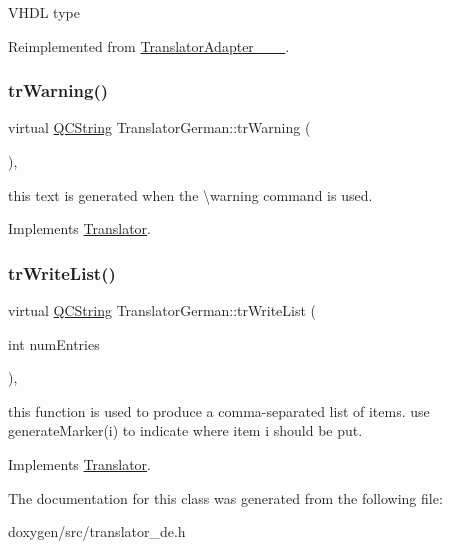 V\+H\+DL type 

Reimplemented from \mbox{\hyperlink{class_translator_adapter__1__8__15}{Translator\+Adapter\+\_\+\_\+\_}}.

\mbox{\label{class_translator_german_aee79ab416d3067077976eda0ec2fe9e6}} 
\subsubsection{\texorpdfstring{trWarning()}{trWarning()}}
{\footnotesize\ttfamily virtual \mbox{\hyperlink{class_q_c_string}{Q\+C\+String}} Translator\+German\+::tr\+Warning (\begin{DoxyParamCaption}{ }\end{DoxyParamCaption})\hspace{0.3cm}{\ttfamily [inline]}, {\ttfamily [virtual]}}

this text is generated when the \textbackslash{}warning command is used. 

Implements \mbox{\hyperlink{class_translator}{Translator}}.

\mbox{\label{class_translator_german_ad5fec4eb2e9d641fc19a4cd6e212a5d7}} 
\subsubsection{\texorpdfstring{trWriteList()}{trWriteList()}}
{\footnotesize\ttfamily virtual \mbox{\hyperlink{class_q_c_string}{Q\+C\+String}} Translator\+German\+::tr\+Write\+List (\begin{DoxyParamCaption}\item[{int}]{num\+Entries }\end{DoxyParamCaption})\hspace{0.3cm}{\ttfamily [inline]}, {\ttfamily [virtual]}}

this function is used to produce a comma-\/separated list of items. use generate\+Marker(i) to indicate where item i should be put. 

Implements \mbox{\hyperlink{class_translator}{Translator}}.



The documentation for this class was generated from the following file\+:\begin{DoxyCompactItemize}
\item 
doxygen/src/translator\+\_\+de.\+h\end{DoxyCompactItemize}
